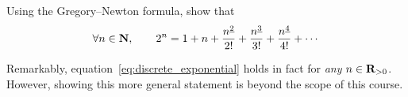 \begin{exercise}
    Using the Gregory--Newton formula,
    show that
    \begin{equation}
        \label{eq:discrete_exponential}
        \forall n \in \mathbf N,
        \qquad 2^n = 1 + n + \frac{n^{\underline{2}}}{2!} + \frac{n^{\underline 3}}{3!} + \frac{n^{\underline 4}}{4!} + \dotsb
    \end{equation}
    \begin{remark}
        Remarkably, equation~\eqref{eq:discrete_exponential} holds in fact for \emph{any} $n \in \mathbf R_{> 0}$.
        However, showing this more general statement is beyond the scope of this course.
    \end{remark}
\end{exercise}
